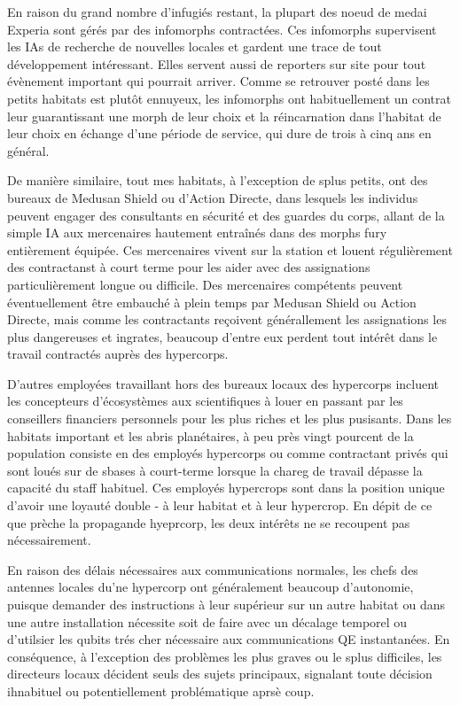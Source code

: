                En raison du grand nombre d'infugiés restant, la plupart des noeud de medai Experia sont gérés par des infomorphs contractées. Ces infomorphs supervisent les IAs de recherche de nouvelles locales et gardent une trace de tout développement intéressant. Elles servent aussi de reporters sur site pour tout évènement important qui pourrait arriver. Comme se retrouver posté dans les petits habitats est plutôt ennuyeux, les infomorphs ont habituellement un contrat leur guarantissant une morph de leur choix et la réincarnation dans l'habitat de leur choix en échange d'une période de service, qui dure de trois à cinq ans en général. 

               De manière similaire, tout mes habitats, à l'exception de splus petits, ont des bureaux de Medusan Shield ou d'Action Directe, dans lesquels les individus peuvent engager des consultants en sécurité et des guardes du corps, allant de la simple IA aux mercenaires hautement entraînés dans des morphs fury entièrement équipée. Ces mercenaires vivent sur la station et louent régulièrement des contractanst à court terme pour les aider avec des assignations particulièrement longue ou difficile. Des mercenaires compétents peuvent éventuellement être embauché à plein temps par Medusan Shield ou Action Directe, mais comme les contractants reçoivent générallement les assignations les plus dangereuses et ingrates, beaucoup d'entre eux perdent tout intérêt dans le travail contractés auprès des hypercorps. 

               D'autres employées travaillant hors des bureaux locaux des hypercorps incluent les concepteurs d'écosystèmes aux scientifiques à louer en passant par les conseillers financiers personnels pour les plus riches et les plus pusisants. Dans les habitats important et les abris planétaires, à peu près vingt pourcent de la population consiste en des employés hypercorps ou comme contractant privés qui sont loués sur de sbases à court-terme lorsque la chareg de travail dépasse la capacité du staff habituel. Ces employés hypercrops sont dans la position unique d'avoir une loyauté double - à leur habitat et à leur hypercrop. En dépit de ce que prèche la propagande hyeprcorp, les deux intérêts ne se recoupent pas nécessairement. 

               En raison des délais nécessaires aux communications normales, les chefs des antennes locales du'ne hypercorp ont généralement beaucoup d'autonomie, puisque demander des instructions à leur supérieur sur un autre habitat ou dans une autre installation nécessite soit de faire avec un décalage temporel ou d'utilsier les qubits trés cher nécessaire aux communications QE instantanées. En conséquence, à l'exception des problèmes les plus graves ou le splus difficiles, les directeurs locaux décident seuls des sujets principaux, signalant toute décision ihnabituel ou potentiellement problématique aprsè coup. 

